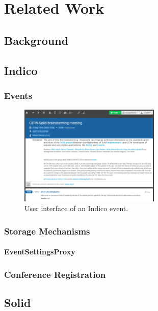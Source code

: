 \chapter{Related Work}
\setcounter{section}{0}

\section{Background}

\section{Indico}


\subsection{Events}

\begin{figure}[H]
    \centering
    \includegraphics[width=0.6\textwidth]{thesis/latex/assets/indico-event-interface.png}
    \caption{User interface of an Indico event.}
    \label{fig:indico-event-interface}
\end{figure} 

\subsection{Storage Mechanisms}

\subsubsection{EventSettingsProxy}

\subsection{Conference Registration}

\section{Solid}

